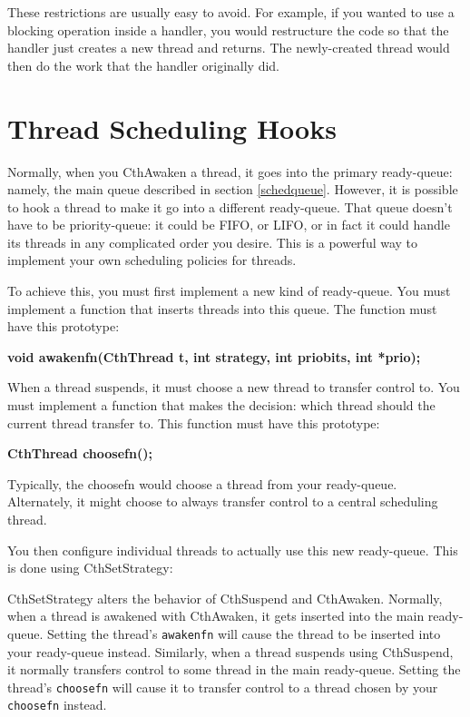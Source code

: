 These restrictions are usually easy to avoid.  For example, if you
wanted to use a blocking operation inside a \converse{} handler, you
would restructure the code so that the handler just creates a new
thread and returns.  The newly-created thread would then do the work
that the handler originally did.

\section{Thread Scheduling Hooks}

Normally, when you CthAwaken a thread, it goes into the primary
ready-queue: namely, the main \converse{} queue described in section
\ref{schedqueue}.  However, it is possible to hook a thread to make
it go into a different ready-queue.  That queue doesn't have to be
priority-queue: it could be FIFO, or LIFO, or in fact it could handle
its threads in any complicated order you desire.  This is a powerful
way to implement your own scheduling policies for threads.

To achieve this, you must first implement a new kind of ready-queue.
You must implement a function that inserts threads into this queue.
The function must have this prototype:

{\bf void awakenfn(CthThread t, int strategy, int priobits, int *prio);}

When a thread suspends, it must choose a new thread to transfer control
to.  You must implement a function that makes the decision: which thread
should the current thread transfer to.  This function must have this
prototype:

{\bf CthThread choosefn();}

Typically, the choosefn would choose a thread from your ready-queue.
Alternately, it might choose to always transfer control to a central
scheduling thread.

You then configure individual threads to actually use this new
ready-queue.  This is done using CthSetStrategy:


CthSetStrategy alters the behavior of CthSuspend and CthAwaken.
Normally, when a thread is awakened with CthAwaken, it gets inserted
into the main ready-queue.  Setting the thread's {\tt awakenfn} will
cause the thread to be inserted into your ready-queue instead.
Similarly, when a thread suspends using CthSuspend, it normally
transfers control to some thread in the main ready-queue.  Setting the
thread's {\tt choosefn} will cause it to transfer control to a thread
chosen by your {\tt choosefn} instead.

